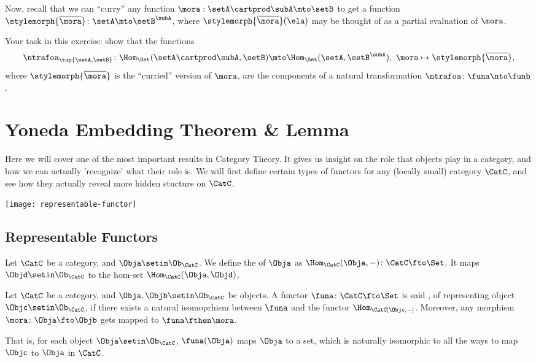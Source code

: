 \begin{gradedexercise}
    Now, recall that we can ``curry'' any function $\mora : \setA \cartprod \subA \mto \setB$ to get a function $\stylemorph{\overline{{\mora}}} \colon \setA \mto \setB^\subA$, where $\stylemorph{\overline{{\mora}}}(\ela)$ may be thought of as a partial evaluation of $\mora$.

    Your task in this exercise: show that the functions
    \begin{equation}
        \ntrafoa_{\tup{\setA, \setB}} \colon \Hom_\Set(\setA \cartprod \subA, \setB) \mto \Hom_\Set(\setA, \setB^\subA), \ \mora \mapsto \stylemorph{\overline{{\mora}}},
    \end{equation}
    where $\stylemorph{\overline{{\mora}}}$ is the ``curried'' version of $\mora$, are the components of a natural transformation $\ntrafoa \colon \funa \nto \funb$.
\end{gradedexercise}


\section{Yoneda Embedding Theorem \& Lemma}
Here we will cover one of the most important results in Category Theory.
It gives us insight on the role that objects play
in a category, and how we can actually 'recognize' what their role is.
We will first define certain types of functors for any (locally small) category $\CatC$, and see how they actually reveal more hidden stucture on $\CatC$.

\begin{marginfigure}
    \centering
    \texttt{[image: representable-functor]}
    \label{fig:representable-functor}
\end{marginfigure}

\subsection{Representable Functors}
\begin{ctdefinition}
    Let $\CatC$ be a category, and $\Obja \setin \Ob_\CatC$.
    We define the  of $\Obja$ as $\Hom_\CatC(\Obja, -)\colon\CatC\fto\Set$.
    It maps $\Objd \setin \Ob_\CatC$ to the hom-set $\Hom_\CatC(\Obja, \Objd)$.
\end{ctdefinition}

\begin{ctdefinition}
    Let $\CatC$ be a category, and $\Obja, \Objb \setin \Ob_\CatC$ be objects.
    A functor $\funa\colon\CatC \fto \Set$ is said , of representing object $\Objc\setin\Ob_\CatC$, if there exists a natural isomoprhism between $\funa$ and the functor $\Hom_\CatC[\Objc, -]$.
    Moreover, any morphism $\mora\colon\Obja\fto\Objb$ gets mapped to $\funa\fthen\mora$.

    That is, for each object $\Obja \setin \Ob_\CatC$, $\funa(\Obja)$ maps $\Obja$ to a set, which is naturally isomorphic to all the ways to map $\Objc$ to $\Obja$ in $\CatC$.
\end{ctdefinition}

